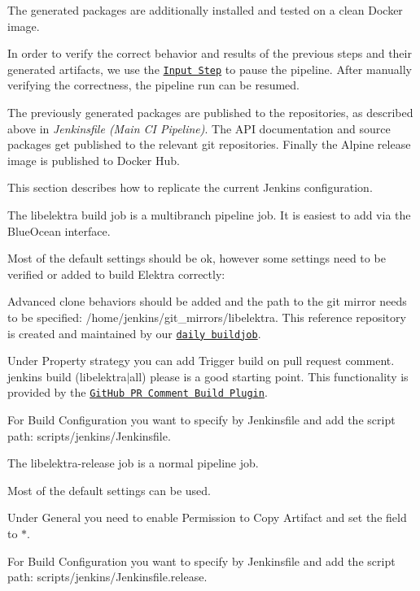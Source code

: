 The generated packages are additionally installed and tested on a clean Docker image.

In order to verify the correct behavior and results of the previous steps and their generated artifacts, we use the \href{https://www.jenkins.io/doc/pipeline/steps/pipeline-input-step/}{\tt Input Step} to pause the pipeline. After manually verifying the correctness, the pipeline run can be resumed.

The previously generated packages are published to the repositories, as described above in {\itshape Jenkinsfile (Main CI Pipeline)}. The A\+PI documentation and source packages get published to the relevant git repositories. Finally the Alpine release image is published to Docker Hub.

This section describes how to replicate the current Jenkins configuration.

The {\ttfamily libelektra} build job is a multibranch pipeline job. It is easiest to add via the Blue\+Ocean interface.

Most of the default settings should be ok, however some settings need to be verified or added to build Elektra correctly\+:


\begin{DoxyItemize}
\item {\ttfamily Advanced clone behaviors} should be added and the path to the git mirror needs to be specified\+: {\ttfamily /home/jenkins/git\+\_\+mirrors/libelektra}. This reference repository is created and maintained by our \href{https://build.libelektra.org/job/libelektra-daily/}{\tt daily buildjob}.
\item Under Property strategy you can add {\ttfamily Trigger build on pull request comment}. {\ttfamily jenkins build (libelektra$\vert$all) please} is a good starting point. This functionality is provided by the \href{https://wiki.jenkins-ci.org/display/JENKINS/GitHub+PR+Comment+Build+Plugin}{\tt Git\+Hub PR Comment Build Plugin}.
\item For Build Configuration you want to specify {\ttfamily by Jenkinsfile} and add the script path\+: {\ttfamily scripts/jenkins/\+Jenkinsfile}.
\end{DoxyItemize}

The {\ttfamily libelektra-\/release} job is a normal pipeline job.

Most of the default settings can be used.


\begin{DoxyItemize}
\item Under General you need to enable {\ttfamily Permission to Copy Artifact} and set the field to {\ttfamily $\ast$}.
\item For Build Configuration you want to specify {\ttfamily by Jenkinsfile} and add the script path\+: {\ttfamily scripts/jenkins/\+Jenkinsfile.\+release}.
\end{DoxyItemize}

